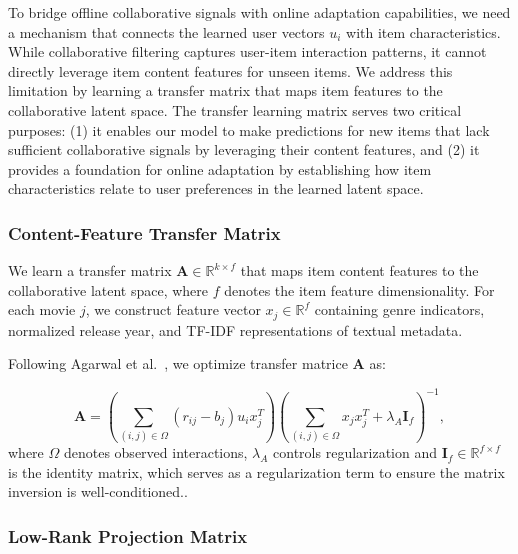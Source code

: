 \documentclass[acmsmall]{acmart}
\begin{document}
To bridge offline collaborative signals with online adaptation capabilities, we need a mechanism that connects the learned user vectors $u_i$ with item characteristics. While collaborative filtering captures user-item interaction patterns, it cannot directly leverage item content features for unseen items. We address this limitation by learning a transfer matrix that maps item features to the collaborative latent space.
 The transfer learning matrix serves two critical purposes: (1) it enables our model to make predictions for new items that lack sufficient collaborative signals by leveraging their content features, and (2) it provides a foundation for online adaptation by establishing how item characteristics relate to user preferences in the learned latent space.

\subsubsection{Content-Feature Transfer Matrix}

We learn a transfer matrix $\mathbf{A} \in \mathbb{R}^{k \times f}$ that maps item content features to the collaborative latent space, where $f$ denotes the item feature dimensionality. For each movie $j$, we construct feature vector $x_j \in \mathbb{R}^f$ containing genre indicators, normalized release year, and TF-IDF representations of textual metadata.

Following Agarwal et al.~\cite{agarwal2010fast}, we optimize transfer matrice $\mathbf{A}$ as:

\begin{equation}
\mathbf{A} = \left(\sum_{(i,j) \in \Omega} (r_{ij} - b_j) u_i x_j^T\right) \left(\sum_{(i,j) \in \Omega} x_j x_j^T + \lambda_A \mathbf{I}_f\right)^{-1},
\label{eq:transfer_solution}
\end{equation}
where $\Omega$ denotes observed interactions, $\lambda_A$ controls regularization and $\mathbf{I}_f \in \mathbb{R}^{f \times f}$ is the identity matrix, which serves as a regularization term to ensure the matrix inversion is well-conditioned.. 
\subsubsection{Low-Rank Projection Matrix}
\end{document}

